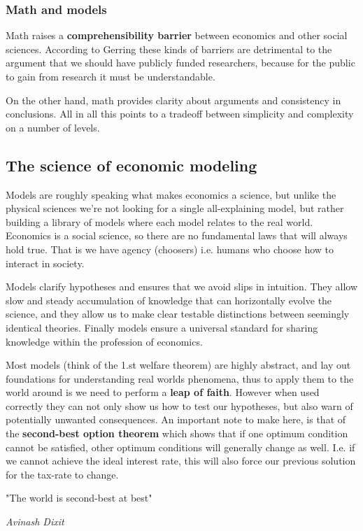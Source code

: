 \documentclass[12pt, a4paper]{article}
\begin{document}
\begin{multicols}{2}
\subsubsection{Math and models}
Math raises a \textbf{comprehensibility barrier} between economics and other social sciences. According to Gerring these kinds of barriers are detrimental to the argument that we should have publicly funded researchers, because for the public to gain from research it must be understandable.

On the other hand, math provides clarity about arguments and consistency in conclusions. All in all this points to a tradeoff between simplicity and complexity on a number of levels. 



\subsection{The science of economic modeling}
Models are roughly speaking what makes economics a science, but unlike the physical sciences we're not looking for a single all-explaining model, but rather building a library of models where each model relates to the real world. Economics is a social science, so there are no fundamental laws that will always hold true. That is we have agency (choosers) i.e. humans who choose how to interact in society. 

Models clarify hypotheses and ensures that we avoid slips in intuition. They allow slow and steady accumulation of knowledge that can horizontally evolve the science, and they allow us to make clear testable distinctions between seemingly identical theories. Finally models ensure a universal standard for sharing knowledge within the profession of economics. 

Most models (think of the 1.st welfare theorem) are highly abstract, and lay out foundations for understanding real worlds phenomena, thus to apply them to the world around is we need to perform a \textbf{leap of faith}. However when used correctly they can not only show us how to test our hypotheses, but also warn of potentially unwanted consequences. An important note to make here, is that of the \textbf{second-best option theorem} which shows that if one optimum condition cannot be satisfied, other optimum conditions will generally change as well. I.e. if we cannot achieve the ideal interest rate, this will also force our previous solution for the tax-rate to change. 

\epigraph{"The world is second-best at best"}{\textit{Avinash Dixit}}


\end{multicols}
\end{document}
